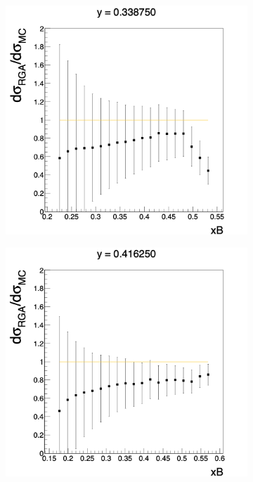 \begin{figure}[h!]
	\centering
	\begin{subfigure}[b]{0.40\linewidth}
		\includegraphics[width=\linewidth]{figures/rga/ratio_0.png}
		\label{fig:rga_ratio0}
	\end{subfigure}
	\begin{subfigure}[b]{0.40\textwidth}
		\includegraphics[width=\linewidth]{figures/rga/ratio_1.png}
		\label{fig:rga_ratio1}
	\end{subfigure}
\end{figure}
